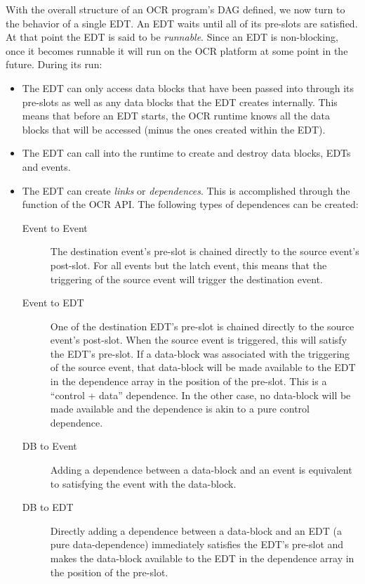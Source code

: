 With the overall structure of an OCR program's DAG defined, we now
turn to the behavior of a single EDT. An EDT waits until all of its
pre-slots are satisfied. At that point the EDT is said to be
\emph{runnable}. Since an EDT is non-blocking, once it
becomes runnable it will run on the OCR platform at some point in the
future. During its run:
\begin{itemize}
\item The EDT can only access data blocks that have been passed into
through its pre-slots as well as any data blocks that the EDT creates
internally. This means that before an EDT starts, the OCR runtime
knows all the data blocks that will be accessed (minus the ones
created within the EDT).

\item The EDT can call into the runtime to create and destroy data
blocks, EDTs and events.

\item The EDT can create \emph{links} or \emph{dependences}. This is
accomplished through the  function of the OCR
API. The following types of dependences can be created:
\begin{description}
\item[Event to Event] The destination event’s pre-slot is chained
directly to the source event’s post-slot.
For all events but the latch event, this means that the triggering of
the source event will trigger the destination event.

\item[Event to EDT] One of the destination EDT’s pre-slot is chained
directly to the source event’s post-slot. When the source event is
triggered, this will satisfy the EDT’s pre-slot. If a data-block was
associated with the triggering of the source event, that data-block
will be made available to the EDT in the dependence array in the
position of the pre-slot. This is a “control + data” dependence. In
the other case, no data-block will be made available and the
dependence is akin to a pure control dependence.

\item[DB to Event] Adding a dependence between a data-block and an
event is equivalent to satisfying the event with the data-block.

\item[DB to EDT] Directly adding a dependence between a data-block and
an EDT (a pure data-dependence) immediately satisfies the EDT’s
pre-slot and makes the data-block available to the EDT in the
dependence array in the position of the pre-slot.


\end{description}
\end{itemize}
